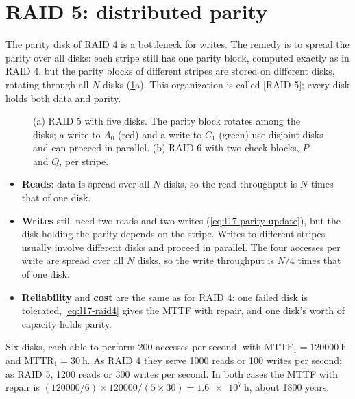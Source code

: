 \documentclass[../main.tex]{subfiles}
\begin{document}
\section{RAID 5: distributed parity}
\label{sec:l17-raid5}

The parity disk of RAID 4 is a bottleneck for writes.  The remedy is to spread the parity over all
disks: each stripe still has one parity block, computed exactly as in RAID 4,
but the parity blocks of different stripes are stored on different disks,
rotating through all $N$ disks (\cref{fig:l17-raid5-6}a).  This organization
is called [RAID 5]; every disk holds both data and parity.

\begin{figure}[htbp]
  \centering
  
  \caption{(a) RAID 5 with five disks.  The parity block rotates among the
    disks; a write to $A_0$ (red) and a write to $C_1$ (green) use disjoint
    disks and can proceed in parallel.  (b) RAID 6 with two check blocks,
    $P$ and $Q$, per stripe.}
  \label{fig:l17-raid5-6}
\end{figure}

\begin{itemize}
  \item \textbf{Reads}: data is spread over all $N$ disks, so the read
    throughput is $N$ times that of one disk.
  \item \textbf{Writes} still need two reads and two writes
    (\cref{eq:l17-parity-update}), but the disk holding the parity depends
    on the stripe.  Writes to different stripes usually involve different
    disks and proceed in parallel.  The four accesses per write are spread
    over all $N$ disks, so the write throughput is $N/4$ times that of one
    disk.
  \item \textbf{Reliability} and \textbf{cost} are the same as for RAID 4:
    one failed disk is tolerated, \cref{eq:l17-raid4} gives the MTTF with
    repair, and one disk's worth of capacity holds parity.
\end{itemize}

\begin{example}
  \label{ex:l17-raid5}
  Six disks, each able to perform 200 accesses per second, with
  $\mathrm{MTTF}_1 = \SI{120000}{\hour}$ and $\mathrm{MTTR}_1 =
  \SI{30}{\hour}$.  As RAID 4 they serve 1000 reads or 100 writes per second;
  as RAID 5, 1200 reads or 300 writes per second.  In both cases the MTTF
  with repair is $(\num{120000}/6) \times \num{120000}/(5 \times 30) =
  \SI{1.6e7}{\hour}$, about \num{1800} years.
\end{example}
\end{document}
